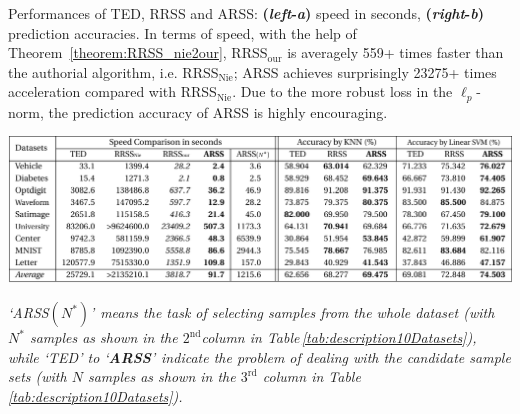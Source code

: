 \documentclass[a4paper]{article}
\begin{document}
\begin{table}[t]
\begin{centering}
\caption{{\small{Performances of TED, RRSS and ARSS: }}\textbf{\scriptsize{(}}\textbf{\emph{\scriptsize{left}}}\textbf{\scriptsize{-}}\textbf{\emph{\scriptsize{a}}}\textbf{\scriptsize{)}}{\small{
speed in seconds, }}\textbf{\scriptsize{(}}\textbf{\emph{\scriptsize{right}}}\textbf{\scriptsize{-}}\textbf{\emph{\scriptsize{b}}}\textbf{\scriptsize{)}}{\small{
prediction accuracies. In terms of speed, with the help of Theorem\ \ref{theorem:RRSS_nie2our},
RRSS$_{\text{our}}$ is averagely 559+ times faster than the authorial
algorithm, i.e. RRSS$_{\text{Nie}}$; ARSS achieves surprisingly 23275+
times acceleration compared with RRSS$_{\text{Nie}}$. Due to the
more robust loss in the $\ell_{p}$-norm, the prediction accuracy
of ARSS is highly encouraging.\label{tab:Compare_Time_perform}}}}
\textbf{\includegraphics[width=2.1\columnwidth]{3F__important_doingWork_myWorks_AAAI2015_figs_compare3methods_time_perform-crop.pdf}}
\par\end{centering}

\raggedright{}\emph{\footnotesize{`ARSS}}\textbf{\emph{\footnotesize{$\left(N^{*}\right)$}}}\emph{\footnotesize{'}}\textbf{\emph{\footnotesize{
}}}\emph{\footnotesize{means the task of selecting samples from the
whole dataset (with $N^{*}$ samples as shown in the $2^{\text{nd}}$column
in Table\,\ref{tab:description10Datasets}), while `TED' to `}}\textbf{\emph{\footnotesize{ARSS}}}\emph{\footnotesize{'}}\textbf{\emph{\footnotesize{
}}}\emph{\footnotesize{indicate the problem of dealing with the candidate
sample sets (with $N$ samples as shown in the $3^{\text{rd}}$ column
in Table\,\ref{tab:description10Datasets}). }}
\end{table}
 
\end{document}
